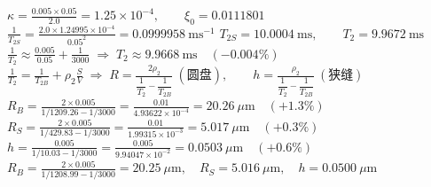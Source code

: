 \documentclass[border=3pt,multi=eqpage]{standalone}
\newenvironment{eqpage}{$\displaystyle}{$}
\begin{document}
\begin{eqpage}\kappa=\frac{0.005\times0.05}{2.0}=1.25\times10^{-4},\qquad \xi_0=0.0111801\end{eqpage}
\begin{eqpage}\frac{1}{T_{2S}}=\frac{2.0\times1.24995\times10^{-4}}{0.05^2}=0.0999958\ \mathrm{ms^{-1}}\end{eqpage}
\begin{eqpage}T_{2S}=10.0004\ \mathrm{ms},\qquad T_2=9.9672\ \mathrm{ms}\end{eqpage}
\begin{eqpage}\frac{1}{T_2}\approx\frac{0.005}{0.05}+\frac{1}{3000}\;\Longrightarrow\;T_2\approx9.9668\ \mathrm{ms}\quad(-0.004\%)\end{eqpage}
\begin{eqpage}\frac{1}{T_2}=\frac{1}{T_{2B}}+\rho_2\frac{S}{V}\;\Longrightarrow\;R=\frac{2\rho_2}{\dfrac{1}{T_2}-\dfrac{1}{T_{2B}}}\ (\text{圆盘}),\qquad h=\frac{\rho_2}{\dfrac{1}{T_2}-\dfrac{1}{T_{2B}}}\ (\text{狭缝})\end{eqpage}
\begin{eqpage}R_B=\frac{2\times0.005}{1/1209.26-1/3000}=\frac{0.01}{4.93622\times10^{-4}}=20.26\ \mu\mathrm{m}\quad(+1.3\%)\end{eqpage}
\begin{eqpage}R_S=\frac{2\times0.005}{1/429.83-1/3000}=\frac{0.01}{1.99315\times10^{-3}}=5.017\ \mu\mathrm{m}\quad(+0.3\%)\end{eqpage}
\begin{eqpage}h=\frac{0.005}{1/10.03-1/3000}=\frac{0.005}{9.94047\times10^{-2}}=0.0503\ \mu\mathrm{m}\quad(+0.6\%)\end{eqpage}
\begin{eqpage}R_B=\frac{2\times0.005}{1/1208.99-1/3000}=20.25\ \mu\mathrm{m},\quad R_S=5.016\ \mu\mathrm{m},\quad h=0.0500\ \mu\mathrm{m}\end{eqpage}
\end{document}
